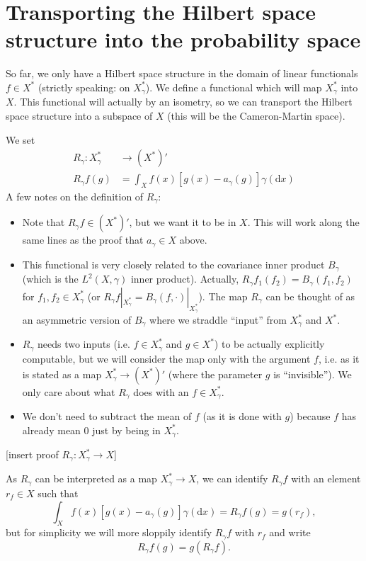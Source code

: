 \documentclass{scrartcl}
\theoremstyle{definition}
\theoremstyle{remark}
\newcommand{\de}{\mathrm d}
\newcommand{\ednote}[1]{{\color{red}[#1]}}
\begin{document}
\section{Transporting the Hilbert space structure into the probability space}
So far, we only have a Hilbert space structure in the domain of linear functionals $f\in X^*$ (strictly speaking: on $X_\gamma^*$). We define a functional which will map $X_\gamma^*$ into $X$. This functional will actually by an isometry, so we can transport the Hilbert space structure into a subspace of $X$ (this will be the Cameron-Martin space).

We set
\begin{align*}
R_\gamma : X_\gamma^* & \to (X^*)'\\
R_\gamma f (g) &= \int_X f(x) [g(x)-a_\gamma(g)]\gamma(\de x)
\end{align*}
A few notes on the definition of $R_\gamma$:
\begin{itemize}
\item Note that $R_\gamma f \in (X^*)'$, but we want it to be in $X$. This will work along the same lines as the proof that $a_\gamma\in X$ above.
\item This functional is very closely related to the covariance inner product $B_\gamma$ (which is the $L^2(X, \gamma)$ inner product). Actually, $R_\gamma f_1 (f_2) = B_\gamma (f_1, f_2)$ for $f_1, f_2\in X_\gamma^*$ (or $R_\gamma f|_{X_\gamma^*} = B_\gamma(f, \cdot)|_{X_\gamma^*}$). The map $R_\gamma$ can be thought of as an asymmetric version of $B_\gamma$ where we straddle ``input'' from $X_\gamma^*$ and $X^*$.
\item $R_\gamma$ needs two inputs (i.e. $f\in X_\gamma^*$ and $g\in X^*$) to be actually explicitly computable, but we will consider the map only with the argument $f$, i.e. as it is stated as a map $X_\gamma^* \to (X^*)'$ (where the parameter $g$ is ``invisible''). We only care about what $R_\gamma$ does with an $f\in X_\gamma^*$.
\item  We don't need to subtract the mean of $f$ (as it is done with $g$) because $f$ has already mean $0$ just by being in $X_\gamma^*$.
\end{itemize}
 \ednote{insert proof $R_\gamma: X_\gamma^*\to X$}

As $R_\gamma$ can be interpreted as a map $X_\gamma^* \to X$, we can identify $R_\gamma f$ with an element $r_f\in X$ such that 
\begin{equation}\label{eq:reconstructingkernel}
\int_X f(x) [g(x)-a_\gamma(g)]\gamma(\de x) = R_\gamma f(g) = g(r_f),
\end{equation}
but for simplicity we will more sloppily identify $R_\gamma f$ with $r_f$ and write
\[ R_\gamma f(g) = g(R_\gamma f).\]
\end{document}
